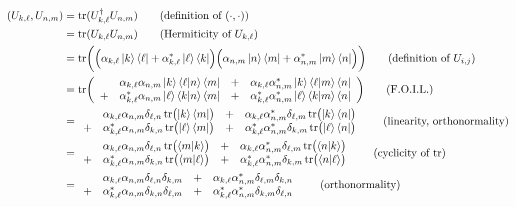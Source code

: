 \begin{align*}
\left(U_{k,\ell},  U_{n,m}\right) &= \Tr(U_{k,\ell}^\dagger U_{n,m}) \tag{definition of $(\cdot, \cdot)$} \\
&= \Tr(U_{k,\ell}U_{n,m}) \tag{Hermiticity of $U_{k,\ell}$} \\
&=\Tr\biggl(  \Bigl(\alpha_{k,\ell}\ket{k}\bra{\ell}+\alpha_{k,\ell}^*\ket{\ell}\bra{k}\Bigr)\Bigl(\alpha_{n,m}\ket{n}\bra{m}+\alpha_{n,m}^*\ket{m}\bra{n}\Bigr)\biggr) \tag{definition of $U_{i,j}$} \\
&=\Tr\biggl(\begin{array}{cccc}& \alpha_{k,\ell}\alpha_{n,m}\ket{k}\braket{\ell|n}\bra{m} &+& \alpha_{k,\ell}\alpha_{n,m}^*\ket{k}\braket{\ell|m}\bra{n} \\ +& \alpha_{k,\ell}^*\alpha_{n,m}\ket{\ell}\braket{k|n}\bra{m} &+& \alpha_{k,\ell}^*\alpha_{n,m}^*\ket{\ell}\braket{k|m}\bra{n}\end{array}\biggr)\tag{F.O.I.L.} \\
&=\begin{array}{cccc}&\alpha_{k,\ell}\alpha_{n,m}\delta_{\ell,n}\Tr\bigl(\ket{k}\bra{m}\bigr) &+& \alpha_{k,\ell}\alpha_{n,m}^*\delta_{\ell,m}\Tr\bigl(\ket{k}\bra{n}\bigr) \\
                                   +&\alpha_{k,\ell}^*\alpha_{n,m}\delta_{k,n}\Tr\bigl(\ket{\ell}\bra{m}\bigr) &+& \alpha_{k,\ell}^*\alpha_{n,m}^*\delta_{k,m}\Tr\bigl(\ket{\ell}\bra{n}\bigr)\end{array} \tag{linearity, orthonormality} \\
&=\begin{array}{cccc}&\alpha_{k,\ell}\alpha_{n,m}\delta_{\ell,n}\Tr\bigl(\braket{m|k}\bigr) &+& \alpha_{k,\ell}\alpha_{n,m}^*\delta_{\ell,m}\Tr\bigl(\braket{n|k}\bigr) \\
                                   +&\alpha_{k,\ell}^*\alpha_{n,m}\delta_{k,n}\Tr\bigl(\braket{m|\ell}\bigr) &+& \alpha_{k,\ell}^*\alpha_{n,m}^*\delta_{k,m}\Tr\bigl(\braket{n|\ell}\bigr)\end{array} \tag{cyclicity of $\Tr$} \\
&=\begin{array}{cccc}&\alpha_{k,\ell}\alpha_{n,m}\delta_{\ell,n}\delta_{k,m} &+& \alpha_{k,\ell}\alpha_{n,m}^*\delta_{\ell,m}\delta_{k,n} \\
                                   +&\alpha_{k,\ell}^*\alpha_{n,m}\delta_{k,n}\delta_{\ell,m} &+& \alpha_{k,\ell}^*\alpha_{n,m}^*\delta_{k,m}\delta_{\ell,n}\end{array} \tag{orthonormality} \\

\end{align*}
